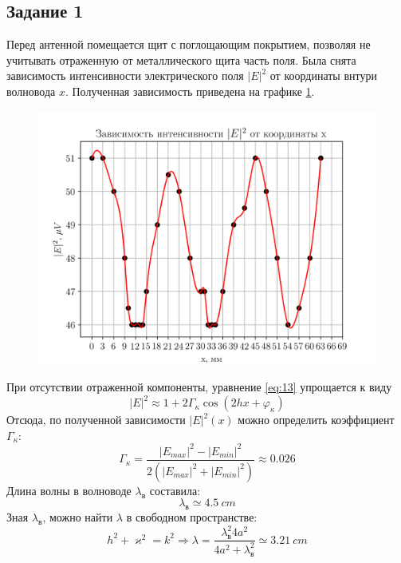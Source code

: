 \subsection{Задание 1}
Перед антенной помещается щит с поглощающим покрытием, позволяя не учитывать отраженную от металлического щита часть
поля. Была снята зависимость интенсивности электрического поля $|E|^2$ от координаты внтури волновода $x$. Полученная
зависимость приведена на графике \ref{fig:exp:1}.
\begin{figure}[h!]
    \centering
    \includegraphics[width = 0.9\linewidth]{graphs/data1.png}
    \label{fig:exp:1}
    \caption{}
\end{figure}

При отсутствии отраженной компоненты, уравнение \eqref{eq:13} упрощается к виду 
\begin{equation}
    |E|^2 \approx 1 + 2 \Gamma_{\kappa} \cos (2 h x + \varphi_{\kappa})
    \label{eq:15}
\end{equation}
Отсюда, по полученной зависимости $|E|^2(x)$ можно определить коэффициент $\Gamma_{\kappa}$:
\begin{equation}
    \Gamma_{\kappa} = \frac{|E_{max}|^2-|E_{min}|^2}{2( |E_{max}|^2+|E_{min}|^2 )} \approx 0.026
    \label{eq:16}
\end{equation}
Длина волны в волноводе $\lambda_{\text{в}}$ составила:
\begin{equation}
    \lambda_{\text{в}} \simeq 4.5 ~ cm    
\end{equation}
Зная $\lambda_{\text{в}}$, можно найти $\lambda$ в свободном пространстве:
\begin{equation}
    h^2 + \varkappa^2 = k^2  \Rightarrow \lambda = \frac{\lambda_{\text{в}}^2 4 a^2}{4a^2+\lambda_{\text{в}}^2} \simeq 3.21 ~cm    
\end{equation}

